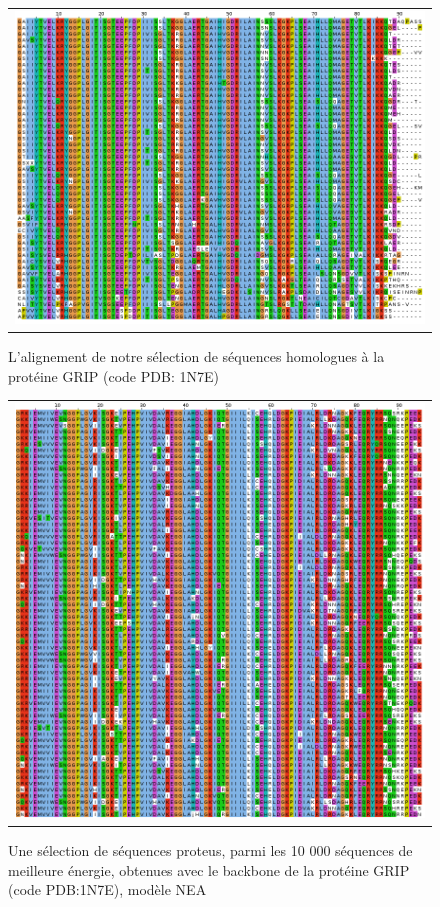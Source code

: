    \begin{figure}[t]
     \centering
     \begin{tabular}{c}
       \includegraphics[width=17cm]{homologues/1N7E.png} \\
     \end{tabular}
     \caption{L'alignement de notre sélection de séquences homologues à la protéine GRIP (code PDB: 1N7E)}
\label{align_homo:GRIP}
   \end{figure}

   \begin{figure}[t]
     \centering
     \begin{tabular}{c}
       \includegraphics[width=17cm]{proteus/1N7E.png} \\
     \end{tabular}
       \caption{Une sélection de séquences proteus, parmi les 10 000 séquences de meilleure énergie, obtenues avec le backbone de la protéine GRIP (code PDB:1N7E), modèle NEA}
\label{align_proteus:GRIP}
   \end{figure}
\clearpage

